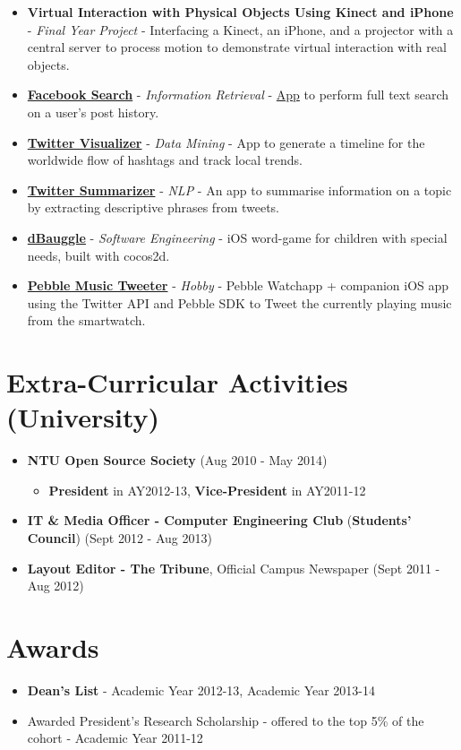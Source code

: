 \begin{itemize}
\item
  \textbf{Virtual Interaction with Physical Objects Using Kinect and
  iPhone} - \emph{Final Year Project} - Interfacing a Kinect, an iPhone,
  and a projector with a central server to process motion to demonstrate
  virtual interaction with real objects.
\item
  \href{https://github.com/arnavk/FacebookSearch}{\textbf{Facebook
  Search}} - \emph{Information Retrieval} -
  \href{http://facebook-search.herokuapp.com/}{App} to perform full text
  search on a user's post history.
\item
  \href{https://github.com/arnavk/Twitter-Visualiser}{\textbf{Twitter
  Visualizer}} - \emph{Data Mining} - App to generate a timeline for the
  worldwide flow of hashtags and track local trends.
\item
  \href{https://github.com/arnavk/NLP}{\textbf{Twitter Summarizer}} -
  \emph{NLP} - An app to summarise information on a topic by extracting
  descriptive phrases from tweets.
\item
  \href{https://itunes.apple.com/us/app/dbauggle!/id625981185?mt=8}{\textbf{dBauggle}}
  - \emph{Software Engineering} - iOS word-game for children with
  special needs, built with cocos2d.
\item
  \href{https://github.com/arnavk/Pebble-MusicTweeter}{\textbf{Pebble
  Music Tweeter}} - \emph{Hobby} - Pebble Watchapp + companion iOS app
  using the Twitter API and Pebble SDK to Tweet the currently playing
  music from the smartwatch.
\end{itemize}

\section{Extra-Curricular Activities
(University)}\label{extra-curricular-activities-university}

\begin{itemize}
\tightlist
\item
  \textbf{NTU Open Source Society} \hfill (Aug 2010 - May 2014)

  \begin{itemize}
  \tightlist
  \item
    \textbf{President} in AY2012-13, \textbf{Vice-President} in
    AY2011-12
  \end{itemize}
\item
  \textbf{IT \& Media Officer - Computer Engineering Club}
  (\textbf{Students' Council}) \hfill (Sept 2012 - Aug 2013)
\item
  \textbf{Layout Editor - The Tribune}, Official Campus Newspaper
  \hfill (Sept 2011 - Aug 2012)
\end{itemize}

\section{Awards}\label{awards}

\begin{itemize}
\tightlist
\item
  \textbf{Dean's List} - Academic Year 2012-13, Academic Year 2013-14
\item
  Awarded President's Research Scholarship - offered to the top 5\% of
  the cohort - Academic Year 2011-12
\end{itemize}
